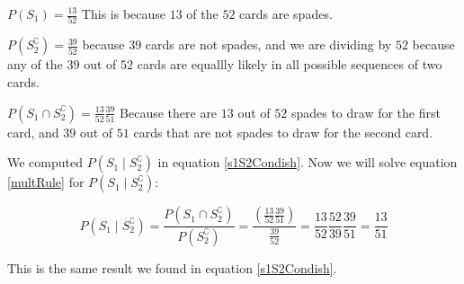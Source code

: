 \documentclass[a4paper,11pt]{article}
\begin{document}
$P\left( S_{1} \right) = \frac{13}{52}$  This is because $13$ of the 
$52$ cards are spades.

$ P\left( S_{2}^{\complement} \right) = \frac{39}{52}$ because $39$ 
cards are not spades, and we are dividing by $52$ because any of the 
$39$ out of $52$ cards are equallly likely in all possible sequences 
of two cards.


$P \left( S_{1} \cap S_{2}^{\complement} \right)
 = \frac{13}{52} \frac{39}{51}$
Because there are $13$ out of $52$ spades to draw for the first card,
and $39$ out of $51$ cards that are not spades to draw for the second
card.

We computed $P\left(S_{1} \mid S_{2}^{\complement} \right)$ in 
equation \ref{s1S2Condish}.  Now we will solve equation \ref{multRule} for 
$P\left(S_{1} \mid S_{2}^{\complement} \right)$:

\begin{equation} \label{multRule}
  P\left(S_{1} \mid S_{2}^{\complement}\right) = 
  \frac
  {
    P\left(S_{1} \cap S_{2}^{\complement}\right)
  }
  {
    P\left(S_{2}^{\complement}\right)
  } =
  \frac 
  { 
    \left( \frac{13}{52} \frac{39}{51} \right) 
  }
  {
    \frac{39}{52}
  } =
  \frac{13}{52} \frac{52}{39} \frac{39}{51} =
  \frac{13}{51}
\end{equation}

This is the same result we found in equation \ref{s1S2Condish}.

\printbibliography{}
\end{document}

